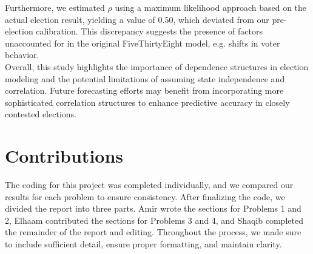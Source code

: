 \documentclass{report}
\begin{document}
Furthermore, we estimated $\rho$ using a maximum likelihood approach based on the actual election result, yielding a value of 0.50, which deviated from our pre-election calibration. This discrepancy suggests the presence of factors unaccounted for in the original FiveThirtyEight model, e.g. shifts in voter behavior.  \\ 

Overall, this study highlights the importance of dependence structures in election modeling and the potential limitations of assuming state independence and correlation. Future forecasting efforts may benefit from incorporating more sophisticated correlation structures to enhance predictive accuracy in closely contested elections.

\section*{Contributions}
The coding for this project was completed individually, and we compared our results for each problem to ensure consistency. After finalizing the code, we divided the report into three parts. Amir wrote the sections for Problems 1 and 2, Elhaam contributed the sections for Problems 3 and 4, and Shaqib completed the remainder of the report and editing. Throughout the process, we made sure to include sufficient detail, ensure proper formatting, and maintain clarity.

\pagebreak
\end{document}
